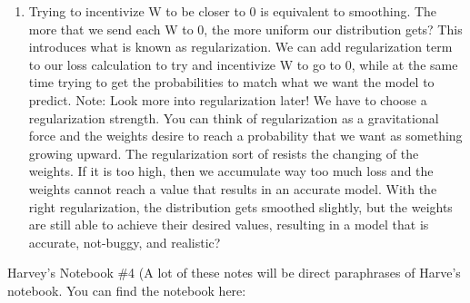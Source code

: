 \documentclass[a4paper, 11pt, oneside]{researchjournal} %
\begin{document}
\begin{enumerate}
    \item Trying to incentivize W to be closer to 0 is equivalent to smoothing. The more that we send each W to 0, the more uniform our distribution gets? This introduces what is known as regularization. We can add regularization term to our loss calculation to try and incentivize W to go to 0, while at the same time trying to get the probabilities to match what we want the model to predict. Note: Look more into regularization later! We have to choose a regularization strength. You can think of regularization as a gravitational force and the weights desire to reach a probability that we want as something growing upward. The regularization sort of resists the changing of the weights. If it is too high, then we accumulate way too much loss and the weights cannot reach a value that results in an accurate model. With the right regularization, the distribution gets smoothed slightly, but the weights are still able to achieve their desired values, resulting in a model that is accurate, not-buggy, and realistic?
\end{enumerate}


Harvey's Notebook \#4 (A lot of these notes will be direct paraphrases of Harve's notebook. You can find the notebook here: \cite{HarveyDamTREUGit}
\end{document}

